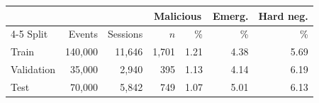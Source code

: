 \begin{tabular}{lrrrrrr}
\toprule
& & & \multicolumn{2}{c}{Malicious} & Emerg. & Hard neg. \\
\cmidrule(lr){4-5}
Split & Events & Sessions & $n$ & \% & \% & \% \\
\midrule
Train & 140{,}000 & 11{,}646 & 1{,}701 & 1.21 & 4.38 & 5.69 \\
Validation & 35{,}000 & 2{,}940 & 395 & 1.13 & 4.14 & 6.19 \\
Test & 70{,}000 & 5{,}842 & 749 & 1.07 & 5.01 & 6.13 \\
\bottomrule
\end{tabular}
